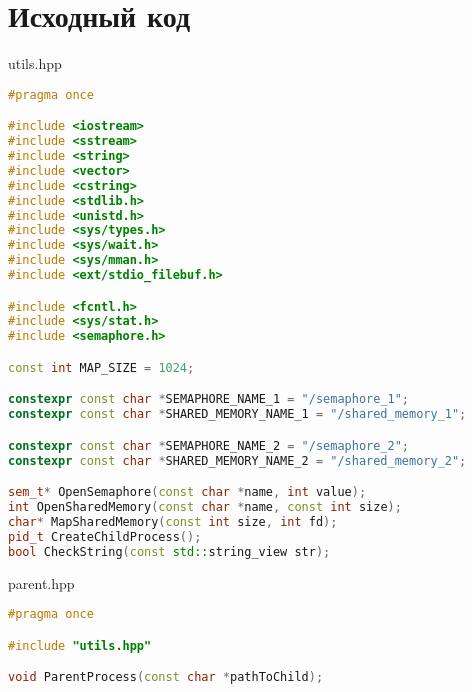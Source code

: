 \documentclass[a4paper, 12pt]{article}
\begin{document}
\newpage

\section{Исходный код}
utils.hpp
\begin{lstlisting}[language=C++]
#pragma once

#include <iostream>
#include <sstream>
#include <string>
#include <vector>
#include <cstring>
#include <stdlib.h>
#include <unistd.h>
#include <sys/types.h>
#include <sys/wait.h>
#include <sys/mman.h>
#include <ext/stdio_filebuf.h>

#include <fcntl.h>
#include <sys/stat.h>
#include <semaphore.h>

const int MAP_SIZE = 1024;

constexpr const char *SEMAPHORE_NAME_1 = "/semaphore_1";
constexpr const char *SHARED_MEMORY_NAME_1 = "/shared_memory_1";

constexpr const char *SEMAPHORE_NAME_2 = "/semaphore_2";
constexpr const char *SHARED_MEMORY_NAME_2 = "/shared_memory_2";

sem_t* OpenSemaphore(const char *name, int value);
int OpenSharedMemory(const char *name, const int size);
char* MapSharedMemory(const int size, int fd);
pid_t CreateChildProcess();
bool CheckString(const std::string_view str);
\end{lstlisting}

parent.hpp
\begin{lstlisting}[language=C++]
#pragma once

#include "utils.hpp"

void ParentProcess(const char *pathToChild);
\end{lstlisting}
\end{document}
